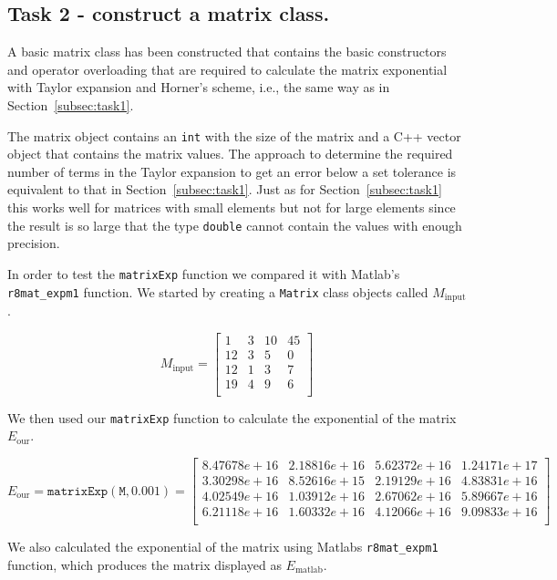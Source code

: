 \documentclass[paper=a4, fontsize=11pt]{article} %
\begin{document}
\subsection{Task 2 - construct a matrix class.}

A basic matrix class has been constructed that contains the basic
constructors and operator overloading that are required to calculate
the matrix exponential with Taylor expansion and Horner's scheme,
i.e., the same way as in Section~\ref{subsec:task1}.

The matrix object contains an \texttt{int} with the size of the matrix
and a C++ vector object that contains the matrix values. The approach
to determine the required number of terms in the Taylor expansion to
get an error below a set tolerance is equivalent to that in
Section~\ref{subsec:task1}. Just as for Section~\ref{subsec:task1}
this works well for matrices with small elements but not for large
elements since the result is so large that the type \texttt{double}
cannot contain the values with enough precision.

In order to test the \texttt{matrixExp} function we compared it with
Matlab's \texttt{r8mat\_{expm1}} function. We started by creating a
\texttt{Matrix} class objects called $M_{\text{input}}$.

\[
M_{\text{input}}=
  \begin{bmatrix}
    1 & 3 & 10 & 45 \\
    12 & 3 & 5 & 0 \\
    12 & 1 & 3 & 7 \\
    19 & 4 & 9 & 6 \\
  \end{bmatrix}
\]

We then used our \texttt{matrixExp} function to calculate the
exponential of the matrix $E_{\text{our}}$.

\[
E_{\text{our}} = \mathtt{matrixExp(M,0.001)} =
  \begin{bmatrix}
 8.47678e+16 & 2.18816e+16 & 5.62372e+16 & 1.24171e+17 \\
 3.30298e+16 & 8.52616e+15 & 2.19129e+16 & 4.83831e+16 \\
 4.02549e+16 & 1.03912e+16 & 2.67062e+16 & 5.89667e+16 \\
 6.21118e+16 & 1.60332e+16 & 4.12066e+16 & 9.09833e+16 \\
  \end{bmatrix}
\]

We also calculated the exponential of the matrix using Matlabs
\texttt{r8mat\_{expm1}} function, which produces the matrix displayed
as $E_{\text{matlab}}$.
\end{document}
